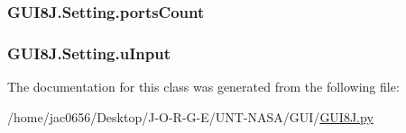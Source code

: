 \subsubsection[{\texorpdfstring{ports\+Count}{portsCount}}]{\setlength{\rightskip}{0pt plus 5cm}G\+U\+I8\+J.\+Setting.\+ports\+Count}\hypertarget{classGUI8J_1_1Setting_a6c2f29d2abcaa775eee51448bac03fe3}{}\label{classGUI8J_1_1Setting_a6c2f29d2abcaa775eee51448bac03fe3}
\subsubsection[{\texorpdfstring{u\+Input}{uInput}}]{\setlength{\rightskip}{0pt plus 5cm}G\+U\+I8\+J.\+Setting.\+u\+Input}\hypertarget{classGUI8J_1_1Setting_a3a6044d92a6632b16f1c0c6c752b00f2}{}\label{classGUI8J_1_1Setting_a3a6044d92a6632b16f1c0c6c752b00f2}


The documentation for this class was generated from the following file\+:\begin{DoxyCompactItemize}
\item 
/home/jac0656/\+Desktop/\+J-\/\+O-\/\+R-\/\+G-\/\+E/\+U\+N\+T-\/\+N\+A\+S\+A/\+G\+U\+I/\hyperlink{GUI8J_8py}{G\+U\+I8\+J.\+py}\end{DoxyCompactItemize}
